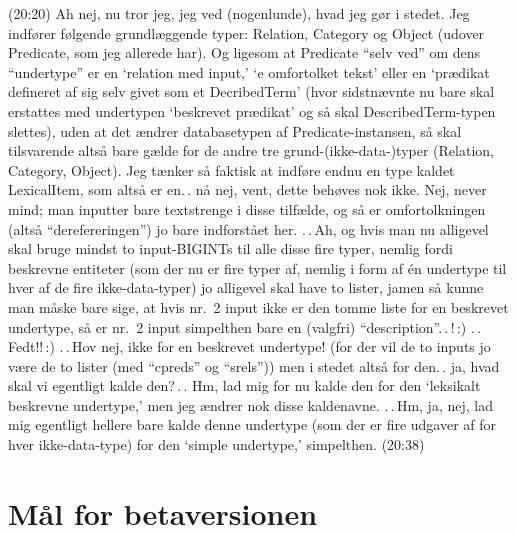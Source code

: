 \documentclass{report}
\begin{document}
(20:20) Ah nej, nu tror jeg, jeg ved (nogenlunde), hvad jeg gør i stedet. Jeg indfører følgende grundlæggende typer: Relation, Category og Object (udover Predicate, som jeg allerede har). Og ligesom at Predicate ``selv ved'' om dens ``undertype'' er en `relation med input,' `e omfortolket tekst' eller en `prædikat defineret af sig selv givet som et DecribedTerm' (hvor sidstnævnte nu bare skal erstattes med undertypen `beskrevet prædikat' og så skal DescribedTerm-typen slettes), uden at det ændrer databasetypen af Predicate-instansen, så skal tilsvarende altså bare gælde for de andre tre grund-(ikke-data-)typer (Relation, Category, Object). Jeg tænker så faktisk at indføre endnu en type kaldet LexicalItem, som altså er en.\,. nå nej, vent, dette behøves nok ikke. Nej, never mind; man inputter bare textstrenge i disse tilfælde, og så er omfortolkningen (altså ``derefereringen'') jo bare indforstået her. .\,.\,Ah, og hvis man nu alligevel skal bruge mindst to input-BIGINTs til alle disse fire typer, nemlig fordi beskrevne entiteter (som der nu er fire typer af, nemlig i form af én undertype til hver af de fire ikke-data-typer) jo alligevel skal have to lister, jamen så kunne man måske bare sige, at hvis nr.\ 2 input ikke er den tomme liste for en beskrevet undertype, så er nr.\ 2 input simpelthen bare en (valgfri) ``description''.\,.\,!\,:) .\,.\,Fedt!!\,:) .\,.\,Hov nej, ikke for en beskrevet undertype! (for der vil de to inputs jo være de to lister (med ``cpreds'' og ``srels'')) men i stedet altså for den.\,. ja, hvad skal vi egentligt kalde den?\,.\,. Hm, lad mig for nu kalde den for den `leksikalt beskrevne undertype,' men jeg ændrer nok disse kaldenavne. .\,.\,Hm, ja, nej, lad mig egentligt hellere bare kalde denne undertype (som der er fire udgaver af for hver ikke-data-type) for den `simple undertype,' simpelthen. (20:38)


\section{Mål for betaversionen}
\end{document}
